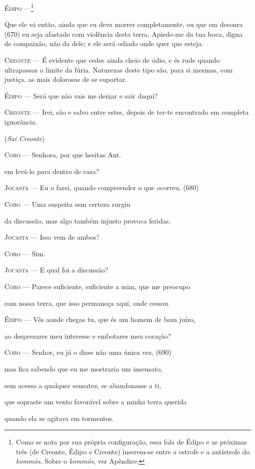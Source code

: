 \textsc{Édipo} ---\footnote{Como se nota por sua própria configuração, essa
  fala de Édipo e as próximas três (de Creonte, Édipo e Creonte)
  inserem-se entre a estrofe e a antístrofe do \emph{kommós.} Sobre o
  \emph{kommós}, ver Apêndice.}

Que ele vá então, ainda que eu deva morrer completamente, ou que em
desonra (670) eu seja afastado com violência desta terra. Apiedo-me da
tua boca, digna de compaixão, não da dele; e ele será odiado onde quer
que esteja.

\textsc{Creonte} --- É evidente que cedes ainda cheio de ódio, e és rude quando ultrapassas o
limite da fúria. Naturezas deste tipo são, para si mesmas, com justiça,
as mais dolorosas de se suportar.

\textsc{Édipo} --- Será que não vais me deixar e sair daqui?

\textsc{Creonte} --- Irei, são e salvo entre estes, depois de ter-te encontrado em completa
ignorância.

(\emph{Sai Creonte})

\textsc{Coro} --- Senhora, por que hesitas Ant.

em levá-lo para dentro de casa?

\textsc{Jocasta} --- Eu o farei, quando compreender o que ocorreu. (680)

\textsc{Coro} --- Uma suspeita sem certeza surgiu

da discussão, mas algo também injusto provoca feridas.

\textsc{Jocasta} --- Isso vem de ambos?

\textsc{Coro} --- Sim.

\textsc{Jocasta} --- E qual foi a discussão?

\textsc{Coro} --- Parece suficiente, suficiente a mim, que me preocupo

com nossa terra, que isso permaneça aqui, onde cessou.

\textsc{Édipo} --- Vês aonde chegas tu, que és um homem de bom juízo,

ao desprezares meu interesse e embotares meu coração?

\textsc{Coro} --- Senhor, eu já o disse não uma única vez, (690)

mas fica sabendo que eu me mostraria um insensato,

sem acesso a qualquer sensatez, se abandonasse a ti,

que sopraste um vento favorável sobre a minha terra querida

quando ela se agitava em tormentos.

